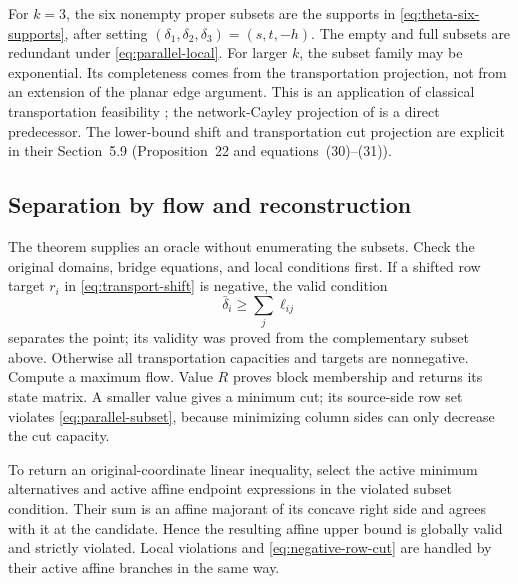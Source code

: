 For $k=3$, the six nonempty proper subsets are the supports in
\eqref{eq:theta-six-supports}, after setting
$(\delta_1,\delta_2,\delta_3)=(s,t,-h)$. The empty and full subsets
are redundant under \eqref{eq:parallel-local}. For larger $k$, the
subset family may be exponential. Its completeness comes from the
transportation projection, not from an extension of the planar edge
argument. This is an application of classical transportation feasibility
\citep{FordFulkerson1956Transportation}; the network-Cayley projection
of \citet[Sections~5.7 and~5.9]{KisHorvath2022} is a direct predecessor.
The lower-bound shift and transportation cut projection are explicit in their
Section~5.9 (Proposition~22 and equations~(30)--(31)).

\subsection{Separation by flow and reconstruction}\label{subsec:parallel-oracle}
The theorem supplies an oracle without enumerating the subsets. Check
the original domains, bridge equations, and local conditions first.
If a shifted row target $r_i$ in \eqref{eq:transport-shift} is negative,
the valid condition
\begin{equation}\label{eq:negative-row-cut}
 \bar\delta_i\ge\sum_j\ell_{ij}
\end{equation}
separates the point; its validity was proved from the complementary
subset above. Otherwise all transportation capacities and targets are
nonnegative. Compute a maximum flow. Value $R$ proves block membership
and returns its state matrix. A smaller value gives a minimum cut;
its source-side row set violates \eqref{eq:parallel-subset}, because
minimizing column sides can only decrease the cut capacity.

To return an original-coordinate linear inequality, select the active
minimum alternatives and active affine endpoint expressions in the
violated subset condition. Their sum is an affine majorant of its
concave right side and agrees with it at the candidate. Hence the
resulting affine upper bound is globally valid and strictly violated.
Local violations and \eqref{eq:negative-row-cut} are handled by their
active affine branches in the same way.

